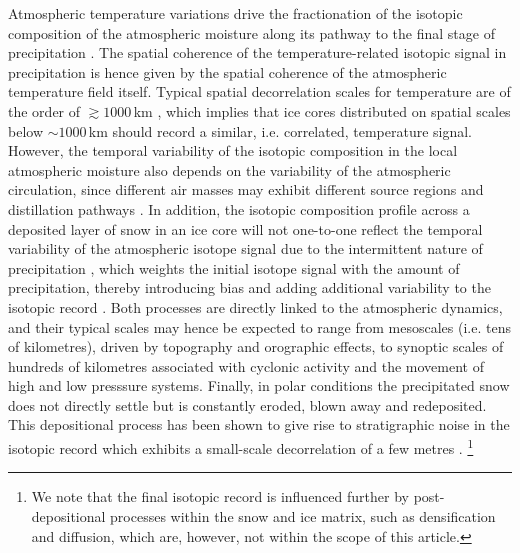 \documentclass[cp, manuscript]{copernicus}
\begin{document}
Atmospheric temperature variations drive the fractionation of the isotopic
composition of the atmospheric moisture along its pathway to the final stage of
precipitation \citep{Dansgaard1964,Jouzel1984}. The spatial coherence
of the temperature-related isotopic signal in precipitation is hence given by
the spatial coherence of the atmospheric temperature field itself. Typical
spatial decorrelation scales for temperature are of the order of
$\gtrsim1000$\,km \citep{Jones1997}, which implies that ice cores distributed on
spatial scales below $\sim 1000$\,km should record a similar, i.e. correlated,
temperature signal. However, the temporal variability of the isotopic
composition in the local atmospheric moisture also depends on the variability of
the atmospheric circulation, since different air masses may exhibit different
source regions and distillation pathways \citep{Schlosser2004,Sodemann2008a,
Birks2009,Kuttel2012}. In addition, the isotopic composition profile across a
deposited layer of snow in an ice core will not one-to-one reflect the temporal
variability of the atmospheric isotope signal due to the intermittent nature of
precipitation \citep{Schleiss2015}, which weights the
initial isotope signal with the amount of precipitation, thereby introducing
bias \citep{Steig1994,Laepple2011a} and adding additional variability to
the isotopic record \citep{Persson2011,Casado2019}. Both processes are directly
linked to the atmospheric dynamics, and their typical scales may hence be
expected to range from mesoscales (i.e. tens of kilometres), driven by
topography and orographic effects, to synoptic scales of hundreds of kilometres
associated with cyclonic activity and the movement of high and low presssure
systems. Finally, in polar conditions the precipitated snow does not directly
settle but is constantly eroded, blown away and redeposited. This depositional
process has been shown to give rise to stratigraphic noise in the isotopic
record \citep{Fisher1985,Munch2016} which exhibits a small-scale decorrelation
of a few metres \citep{Munch2016}.%
\footnote{We note that the final isotopic record is influenced further by
  post-depositional processes within the snow and ice matrix, such as
  densification and diffusion, which are, however, not within the scope of this
  article.}
\end{document}
